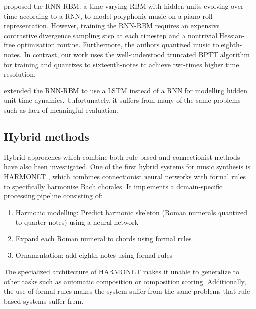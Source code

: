 \citet{Boulanger-Lewandowski2012} proposed the RNN-RBM. a time-varying RBM with
hidden units evolving over time according to a RNN, to model polyphonic music
on a piano roll representation. However, training the RNN-RBM requires an
expensive contrastive divergence sampling step at each timestep and a
nontrivial Hessian-free optimisation routine. Furthermore, the authors
quantized music to eighth-notes. In contrast, our work uses the well-understood
truncated BPTT algorithm for training and quantizes to sixteenth-notes to achieve
two-times higher time resolution.

\citet{Lyu2015} extended the RNN-RBM\citep{Boulanger-Lewandowski2012} to use a
LSTM instead of a RNN for modelling hidden unit time dynamics. Unfortunately,
it suffers from many of the same problems such as lack of meaningful evaluation.


\subsection{Hybrid methods}

Hybrid approaches which combine both rule-based and connectionist methods have
also been investigated. One of the first hybrid systems for music synthesis is
HARMONET \citep{hild1991harmonet}, which combines connectionist neural networks
with formal rules to specifically harmonize Bach chorales. It implements a
domain-specific processing pipeline consisting of:
\begin{enumerate}
  \item Harmonic modelling: Predict harmonic skeleton (\ie Roman numerals
  quantized to quarter-notes) using a neural network
  \item Expand each Roman numeral to chords using formal rules
  \item Ornamentation: add eighth-notes using formal rules
\end{enumerate}
The specialized architecture of HARMONET makes it unable to generalize
to other tasks such as automatic composition or composition scoring.
Additionally, the use of formal rules makes the system suffer from the same
problems that rule-based systems suffer from.

